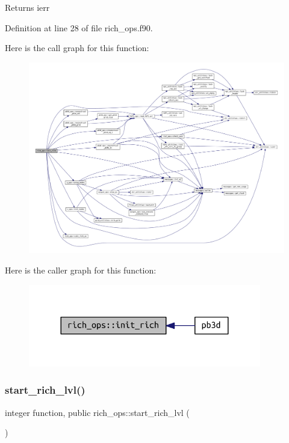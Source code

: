 \begin{DoxyReturn}{Returns}
ierr 
\end{DoxyReturn}


Definition at line 28 of file rich\+\_\+ops.\+f90.

Here is the call graph for this function\+:
\nopagebreak
\begin{figure}[H]
\begin{center}
\leavevmode
\includegraphics[width=350pt]{namespacerich__ops_a9fbbda93eab8973d33063e277c489e7b_cgraph}
\end{center}
\end{figure}
Here is the caller graph for this function\+:\nopagebreak
\begin{figure}[H]
\begin{center}
\leavevmode
\includegraphics[width=288pt]{namespacerich__ops_a9fbbda93eab8973d33063e277c489e7b_icgraph}
\end{center}
\end{figure}
\mbox{\label{namespacerich__ops_a97206a15127960366fcb41d6889cb3b5}} 
\subsubsection{\texorpdfstring{start\+\_\+rich\+\_\+lvl()}{start\_rich\_lvl()}}
{\footnotesize\ttfamily integer function, public rich\+\_\+ops\+::start\+\_\+rich\+\_\+lvl (\begin{DoxyParamCaption}{ }\end{DoxyParamCaption})}



